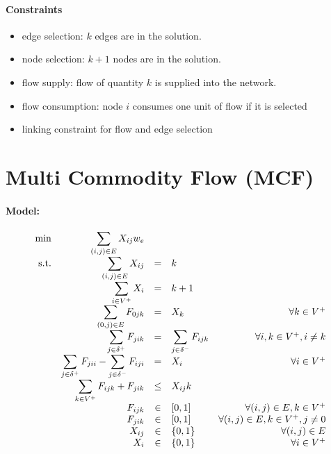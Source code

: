 \documentclass{article}
\begin{document}
\paragraph{Constraints}
\begin{itemize}
	\item edge selection: $k$ edges are in the solution.
	\item node selection: $k + 1$ nodes are in the solution.
	\item flow supply: flow of quantity $k$ is supplied into the network.
	\item flow consumption: node $i$ consumes one unit of flow if it is selected
	\item linking constraint for flow and edge selection
\end{itemize}


\section{Multi Commodity Flow (MCF)}

\paragraph{Model:}
\newcommand{\vkflow}{F_{ijk}}
\newcommand{\vkflowrev}{F_{jik}}
\newcommand{\ksum}{\displaystyle \sum_{k \in V^+}}
\begin{equation}
\begin{array}{r r c l r}
\displaystyle \min & \edgesum {\vedge w_e} \\
\textrm{s.t.}  

& \edgesum \vedge & = & k & \\
& \nodesum \vnode & = & k + 1 & \\
& \displaystyle \sum_{(0, j) \in E} F_{0jk} & = & X_k & \forall k \in V^+ \\

& \displaystyle \sum_{j \in \delta^+} F_{jik} & = & \displaystyle \sum_{j \in \delta^-} F_{ijk} & \forall i, k \in V^+, i \neq k \\
& \displaystyle \sum_{j \in \delta^+} F_{jii} - \displaystyle \sum_{j \in \delta^-} F_{iji}& = & \vnode & \forall i \in V^+ \\

& \ksum F_{ijk} + F_{jik} & \leq & \vedge k & \\

& \vkflow & \in & [0, 1]  &  \forall (i,j) \in E, k \in V^+\\
&\vkflowrev & \in & [0, 1]  &  \forall (i,j) \in E, k \in V^+, j \neq 0\\
& \vedge & \in & \binaries  &  \forall (i,j) \in E\\
& \vnode & \in & \binaries  &  \forall i \in V^+\\

\end{array}
\end{equation}
\end{document}
